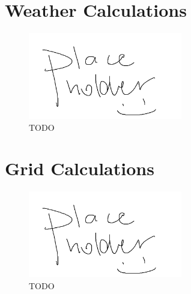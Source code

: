 \documentclass[10pt,letterpaper]{article}
\begin{document}
\clearpage
\section{Weather Calculations}\label{appendix:weather}
\begin{figure}[H]
	\centering
	\includegraphics[width=0.6\textwidth]{assets/placeholder}
	\caption{TODO}
\end{figure}

\clearpage
\section{Grid Calculations}\label{appendix:grid}
\begin{figure}[H]
	\centering
	\includegraphics[width=0.6\textwidth]{assets/placeholder}
	\caption{TODO}
\end{figure}
\end{document}

